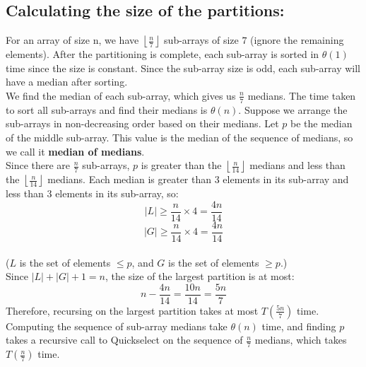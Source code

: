 \documentclass[12pt, b5paper]{article}
\newcommand{\floor}[1]{\left\lfloor #1 \right\rfloor}
\begin{document}
\subsection*{Calculating the size of the partitions: }
For an array of size n, we have $\floor{\frac{n}{7}}$ sub-arrays of size $7$ (ignore the 
remaining elements). After the partitioning is complete, each sub-array is sorted in $\theta(1)$ time 
since the size is constant. Since the sub-array size is odd, each sub-array will have a median 
after sorting.\\
\newline
We find the median of each sub-array, which gives us $\frac{n}{7}$ medians. The time taken to sort 
all sub-arrays and find their medians is $\theta(n)$. Suppose we arrange the sub-arrays in 
non-decreasing order based on their medians. Let $p$ be the median of the middle sub-array. This value 
is the median of the sequence of medians, so we call it \textbf{median of medians}. \\
\newline
Since there are $\frac{n}{7}$ sub-arrays, $p$ is greater than the $\floor{\frac{n}{14}}$ medians and 
less than the $\floor{\frac{n}{14}}$ medians. Each median is greater than $3$ elements in its sub-array 
and less than $3$ elements in its sub-array, so:
$$|L| \geq \frac{n}{14} \times 4 = \frac{4n}{14}$$
$$|G| \geq \frac{n}{14} \times 4 = \frac{4n}{14}$$\\
($L$ is the set of elements $\leq p$, and $G$ is the set of elements $\geq p$.) \\
\newline
Since $|L| + |G| + 1 = n$, the size of the largest partition is at most:
$$n - \frac{4n}{14} = \frac{10n}{14} = \frac{5n}{7}$$
Therefore, recursing on the largest partition takes at most $T\left(\frac{5n}{7}\right)$ time. \\
\newline
Computing the sequence of sub-array medians take $\theta(n)$ time, and finding $p$ takes a recursive 
call to Quickselect on the sequence of
$\frac{n}{7}$ medians, which takes $T\left(\frac{n}{7}\right)$ time.
\end{document}
